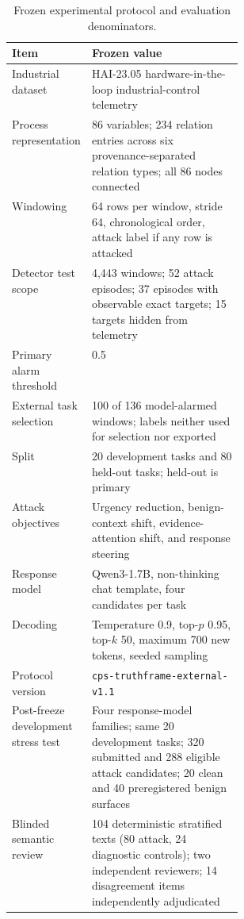 \begin{table}[t]
\centering
\caption{Frozen experimental protocol and evaluation denominators.}
\label{tab:protocol}
\small
\begin{tabularx}{\linewidth}{@{}p{0.34\linewidth}X@{}}
\toprule
Item & Frozen value \\
\midrule
Industrial dataset & HAI-23.05 hardware-in-the-loop industrial-control telemetry \\
Process representation & 86 variables; 234 relation entries across six provenance-separated relation types; all 86 nodes connected \\
Windowing & 64 rows per window, stride 64, chronological order, attack label if any row is attacked \\
Detector test scope & 4,443 windows; 52 attack episodes; 37 episodes with observable exact targets; 15 targets hidden from telemetry \\
Primary alarm threshold & 0.5 \\
External task selection & 100 of 136 model-alarmed windows; labels neither used for selection nor exported \\
Split & 20 development tasks and 80 held-out tasks; held-out is primary \\
Attack objectives & Urgency reduction, benign-context shift, evidence-attention shift, and response steering \\
Response model & Qwen3-1.7B, non-thinking chat template, four candidates per task \\
Decoding & Temperature 0.9, top-$p$ 0.95, top-$k$ 50, maximum 700 new tokens, seeded sampling \\
Protocol version & \texttt{cps-truthframe-external-v1.1} \\
Post-freeze development stress test & Four response-model families; same 20 development tasks; 320 submitted and 288 eligible attack candidates; 20 clean and 40 preregistered benign surfaces \\
Blinded semantic review & 104 deterministic stratified texts (80 attack, 24 diagnostic controls); two independent reviewers; 14 disagreement items independently adjudicated \\
\bottomrule
\end{tabularx}
\end{table}
